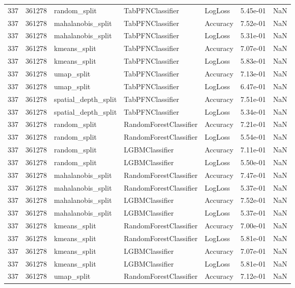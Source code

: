\begin{tabular}{rrlllrr}
337 & 361278 & random\_split & TabPFNClassifier & LogLoss & 5.45e-01 & NaN \\
337 & 361278 & mahalanobis\_split & TabPFNClassifier & Accuracy & 7.52e-01 & NaN \\
337 & 361278 & mahalanobis\_split & TabPFNClassifier & LogLoss & 5.31e-01 & NaN \\
337 & 361278 & kmeans\_split & TabPFNClassifier & Accuracy & 7.07e-01 & NaN \\
337 & 361278 & kmeans\_split & TabPFNClassifier & LogLoss & 5.83e-01 & NaN \\
337 & 361278 & umap\_split & TabPFNClassifier & Accuracy & 7.13e-01 & NaN \\
337 & 361278 & umap\_split & TabPFNClassifier & LogLoss & 6.47e-01 & NaN \\
337 & 361278 & spatial\_depth\_split & TabPFNClassifier & Accuracy & 7.51e-01 & NaN \\
337 & 361278 & spatial\_depth\_split & TabPFNClassifier & LogLoss & 5.34e-01 & NaN \\
337 & 361278 & random\_split & RandomForestClassifier & Accuracy & 7.21e-01 & NaN \\
337 & 361278 & random\_split & RandomForestClassifier & LogLoss & 5.54e-01 & NaN \\
337 & 361278 & random\_split & LGBMClassifier & Accuracy & 7.11e-01 & NaN \\
337 & 361278 & random\_split & LGBMClassifier & LogLoss & 5.50e-01 & NaN \\
337 & 361278 & mahalanobis\_split & RandomForestClassifier & Accuracy & 7.47e-01 & NaN \\
337 & 361278 & mahalanobis\_split & RandomForestClassifier & LogLoss & 5.37e-01 & NaN \\
337 & 361278 & mahalanobis\_split & LGBMClassifier & Accuracy & 7.52e-01 & NaN \\
337 & 361278 & mahalanobis\_split & LGBMClassifier & LogLoss & 5.37e-01 & NaN \\
337 & 361278 & kmeans\_split & RandomForestClassifier & Accuracy & 7.00e-01 & NaN \\
337 & 361278 & kmeans\_split & RandomForestClassifier & LogLoss & 5.81e-01 & NaN \\
337 & 361278 & kmeans\_split & LGBMClassifier & Accuracy & 7.07e-01 & NaN \\
337 & 361278 & kmeans\_split & LGBMClassifier & LogLoss & 5.81e-01 & NaN \\
337 & 361278 & umap\_split & RandomForestClassifier & Accuracy & 7.12e-01 & NaN \\

\end{tabular}
